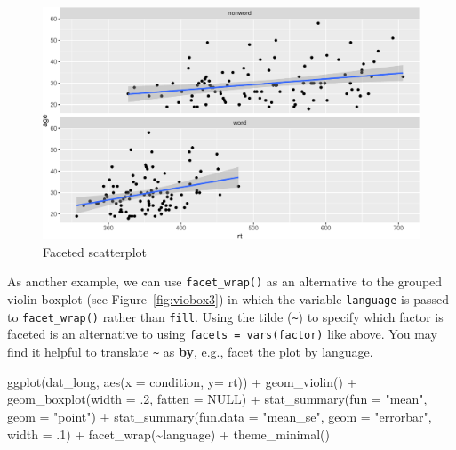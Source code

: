 \documentclass[
  english,
  doc,floatsintext]{apa6}
\newenvironment{Shaded}{\begin{snugshade}}{\end{snugshade}}
\newcommand{\AttributeTok}[1]{\textcolor[rgb]{0.77,0.63,0.00}{#1}}
\newcommand{\ConstantTok}[1]{\textcolor[rgb]{0.00,0.00,0.00}{#1}}
\newcommand{\DecValTok}[1]{\textcolor[rgb]{0.00,0.00,0.81}{#1}}
\newcommand{\FunctionTok}[1]{\textcolor[rgb]{0.00,0.00,0.00}{#1}}
\newcommand{\NormalTok}[1]{#1}
\newcommand{\SpecialCharTok}[1]{\textcolor[rgb]{0.00,0.00,0.00}{#1}}
\newcommand{\StringTok}[1]{\textcolor[rgb]{0.31,0.60,0.02}{#1}}
\begin{document}
\begin{figure}

{\centering \includegraphics[width=1\linewidth]{images/scatterplot-facet-1} 

}

\caption{Faceted scatterplot}\label{fig:scatterplot-facet}
\end{figure}

As another example, we can use \texttt{facet\_wrap()} as an alternative to the grouped violin-boxplot (see Figure~\ref{fig:viobox3}) in which the variable \texttt{language} is passed to \texttt{facet\_wrap()} rather than \texttt{fill}. Using the tilde (\texttt{\textasciitilde{}}) to specify which factor is faceted is an alternative to using \texttt{facets\ =\ vars(factor)} like above. You may find it helpful to translate \texttt{\textasciitilde{}} as \textbf{by}, e.g., facet the plot by language.

\begin{Shaded}
\begin{Highlighting}[]
\FunctionTok{ggplot}\NormalTok{(dat\_long, }\FunctionTok{aes}\NormalTok{(}\AttributeTok{x =}\NormalTok{ condition, }\AttributeTok{y=}\NormalTok{ rt)) }\SpecialCharTok{+}
  \FunctionTok{geom\_violin}\NormalTok{() }\SpecialCharTok{+}
  \FunctionTok{geom\_boxplot}\NormalTok{(}\AttributeTok{width =}\NormalTok{ .}\DecValTok{2}\NormalTok{, }\AttributeTok{fatten =} \ConstantTok{NULL}\NormalTok{) }\SpecialCharTok{+}
  \FunctionTok{stat\_summary}\NormalTok{(}\AttributeTok{fun =} \StringTok{"mean"}\NormalTok{, }\AttributeTok{geom =} \StringTok{"point"}\NormalTok{) }\SpecialCharTok{+}
  \FunctionTok{stat\_summary}\NormalTok{(}\AttributeTok{fun.data =} \StringTok{"mean\_se"}\NormalTok{, }\AttributeTok{geom =} \StringTok{"errorbar"}\NormalTok{, }\AttributeTok{width =}\NormalTok{ .}\DecValTok{1}\NormalTok{) }\SpecialCharTok{+}
  \FunctionTok{facet\_wrap}\NormalTok{(}\SpecialCharTok{\textasciitilde{}}\NormalTok{language) }\SpecialCharTok{+}
  \FunctionTok{theme\_minimal}\NormalTok{()}
\end{Highlighting}
\end{Shaded}
\end{document}
